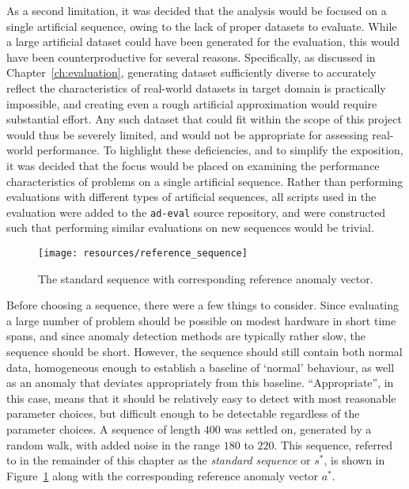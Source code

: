 As a second limitation, it was decided that the analysis would be focused on a single artificial sequence, owing to the lack of proper datasets to evaluate.
While a large artificial dataset could have been generated for the evaluation, this would have been counterproductive for several reasons.
Specifically, as discussed in Chapter~\ref{ch:evaluation}, generating dataset sufficiently diverse to accurately reflect the characteristics of real-world datasets in target domain is practically impossible, and creating even a rough artificial approximation would require substantial effort.
Any such dataset that could fit within the scope of this project would thus be severely limited, and would not be appropriate for assessing real-world performance.
To highlight these deficiencies, and to simplify the exposition, it was decided that the focus would be placed on examining the performance characteristics of problems on a single artificial sequence.
Rather than performing evaluations with different types of artificial sequences, all scripts used in the evaluation were added to the \texttt{ad-eval} source repository, and were constructed such that performing similar evaluations on new sequences would be trivial.

\begin{figure}[h]
    \vspace{-10pt}
    \begin{center}
        \texttt{[image: resources/reference\_sequence]}
    \end{center}
    \vspace{-20pt}
    \caption{\small{The standard sequence with corresponding reference anomaly vector.}}
\label{fig:reference_sequence}
    \vspace{-10pt}
\end{figure}

Before choosing a sequence, there were a few things to consider. Since evaluating a large number of problem should be possible on modest hardware in short time spans, and since anomaly detection methods are typically rather slow, the sequence should be short. However, the sequence should still contain both normal data, homogeneous enough to establish a baseline of `normal' behaviour, as well as an anomaly that deviates appropriately from this baseline. ``Appropriate'', in this case, means that it should be relatively easy to detect with most reasonable parameter choices, but difficult enough to be detectable regardless of the parameter choices. A sequence of length $400$ was settled on, generated by a random walk, with added noise in the range $180$ to $220$. This sequence, referred to in the remainder of this chapter as the \emph{standard sequence} or $s^*$, is shown in Figure~\ref{fig:reference_sequence} along with the corresponding reference anomaly vector $a^*$.

